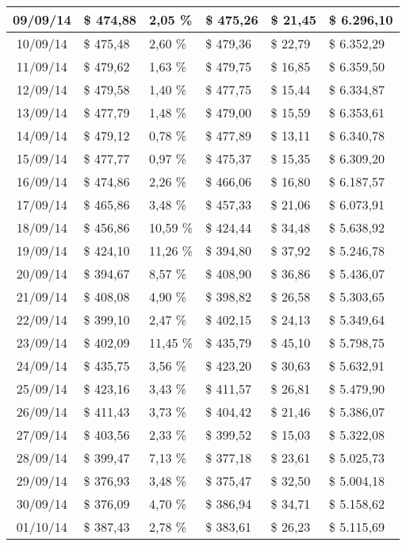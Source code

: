 \begin{small}
\begin{longtable}{|c|l|l|l|l|l|}
09/09/14 & \$ 474,88 & 2,05 \% & \$ 475,26 & \$ 21,45 & \$ 6.296,10 \\ \hline
10/09/14 & \$ 475,48 & 2,60 \% & \$ 479,36 & \$ 22,79 & \$ 6.352,29 \\ \hline
11/09/14 & \$ 479,62 & 1,63 \% & \$ 479,75 & \$ 16,85 & \$ 6.359,50 \\ \hline
12/09/14 & \$ 479,58 & 1,40 \% & \$ 477,75 & \$ 15,44 & \$ 6.334,87 \\ \hline
13/09/14 & \$ 477,79 & 1,48 \% & \$ 479,00 & \$ 15,59 & \$ 6.353,61 \\ \hline
14/09/14 & \$ 479,12 & 0,78 \% & \$ 477,89 & \$ 13,11 & \$ 6.340,78 \\ \hline
15/09/14 & \$ 477,77 & 0,97 \% & \$ 475,37 & \$ 15,35 & \$ 6.309,20 \\ \hline
16/09/14 & \$ 474,86 & 2,26 \% & \$ 466,06 & \$ 16,80 & \$ 6.187,57 \\ \hline
17/09/14 & \$ 465,86 & 3,48 \% & \$ 457,33 & \$ 21,06 & \$ 6.073,91 \\ \hline
18/09/14 & \$ 456,86 & 10,59 \% & \$ 424,44 & \$ 34,48 & \$ 5.638,92 \\ \hline
19/09/14 & \$ 424,10 & 11,26 \% & \$ 394,80 & \$ 37,92 & \$ 5.246,78 \\ \hline
20/09/14 & \$ 394,67 & 8,57 \% & \$ 408,90 & \$ 36,86 & \$ 5.436,07 \\ \hline
21/09/14 & \$ 408,08 & 4,90 \% & \$ 398,82 & \$ 26,58 & \$ 5.303,65 \\ \hline
22/09/14 & \$ 399,10 & 2,47 \% & \$ 402,15 & \$ 24,13 & \$ 5.349,64 \\ \hline
23/09/14 & \$ 402,09 & 11,45 \% & \$ 435,79 & \$ 45,10 & \$ 5.798,75 \\ \hline
24/09/14 & \$ 435,75 & 3,56 \% & \$ 423,20 & \$ 30,63 & \$ 5.632,91 \\ \hline
25/09/14 & \$ 423,16 & 3,43 \% & \$ 411,57 & \$ 26,81 & \$ 5.479,90 \\ \hline
26/09/14 & \$ 411,43 & 3,73 \% & \$ 404,42 & \$ 21,46 & \$ 5.386,07 \\ \hline
27/09/14 & \$ 403,56 & 2,33 \% & \$ 399,52 & \$ 15,03 & \$ 5.322,08 \\ \hline
28/09/14 & \$ 399,47 & 7,13 \% & \$ 377,18 & \$ 23,61 & \$ 5.025,73 \\ \hline
29/09/14 & \$ 376,93 & 3,48 \% & \$ 375,47 & \$ 32,50 & \$ 5.004,18 \\ \hline
30/09/14 & \$ 376,09 & 4,70 \% & \$ 386,94 & \$ 34,71 & \$ 5.158,62 \\ \hline
01/10/14 & \$ 387,43 & 2,78 \% & \$ 383,61 & \$ 26,23 & \$ 5.115,69 \\ \hline

\end{longtable}
\end{small}
